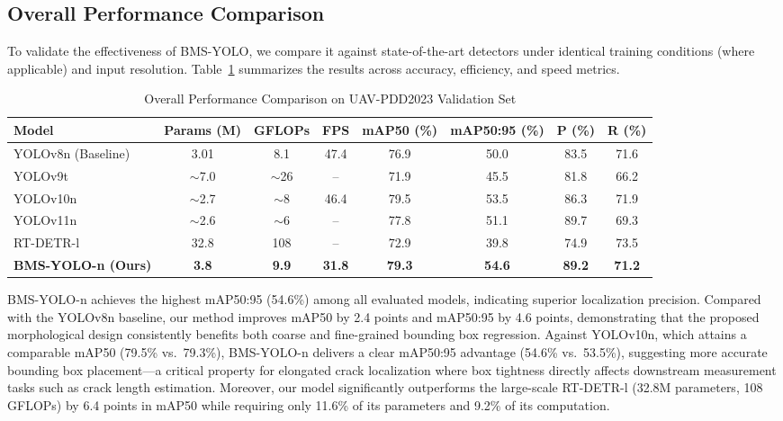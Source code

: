 \subsection{Overall Performance Comparison}

To validate the effectiveness of BMS-YOLO, we compare it against state-of-the-art detectors under identical training conditions (where applicable) and input resolution. Table~\ref{tab:overall} summarizes the results across accuracy, efficiency, and speed metrics.

\begin{table}[!t]
\caption{Overall Performance Comparison on UAV-PDD2023 Validation Set}
\label{tab:overall}
\centering
\setlength{\tabcolsep}{3.5pt}
\begin{tabular}{l|c|c|c|c|c|c|c}
\hline
\hline
Model & Params (M) & GFLOPs & FPS & mAP50 (\%) & mAP50:95 (\%) & P (\%) & R (\%) \\
\hline
YOLOv8n (Baseline) & 3.01 & 8.1 & 47.4 & 76.9 & 50.0 & 83.5 & 71.6 \\
YOLOv9t  & $\sim$7.0 & $\sim$26 & -- & 71.9 & 45.5 & 81.8 & 66.2 \\
YOLOv10n & $\sim$2.7 & $\sim$8  & 46.4 & 79.5 & 53.5 & 86.3 & 71.9 \\
YOLOv11n & $\sim$2.6 & $\sim$6  & -- & 77.8 & 51.1 & 89.7 & 69.3 \\
RT-DETR-l & 32.8 & 108  & -- & 72.9 & 39.8 & 74.9 & 73.5 \\
\hline
\textbf{BMS-YOLO-n (Ours)} & \textbf{3.8} & \textbf{9.9} & \textbf{31.8} & \textbf{79.3} & \textbf{54.6} & \textbf{89.2} & \textbf{71.2} \\
\hline
\end{tabular}
\end{table}

BMS-YOLO-n achieves the highest mAP50:95 (54.6\%) among all evaluated models, indicating superior localization precision. Compared with the YOLOv8n baseline, our method improves mAP50 by 2.4 points and mAP50:95 by 4.6 points, demonstrating that the proposed morphological design consistently benefits both coarse and fine-grained bounding box regression. Against YOLOv10n, which attains a comparable mAP50 (79.5\% vs.\ 79.3\%), BMS-YOLO-n delivers a clear mAP50:95 advantage (54.6\% vs.\ 53.5\%), suggesting more accurate bounding box placement---a critical property for elongated crack localization where box tightness directly affects downstream measurement tasks such as crack length estimation. Moreover, our model significantly outperforms the large-scale RT-DETR-l (32.8M parameters, 108 GFLOPs) by 6.4 points in mAP50 while requiring only 11.6\% of its parameters and 9.2\% of its computation.

